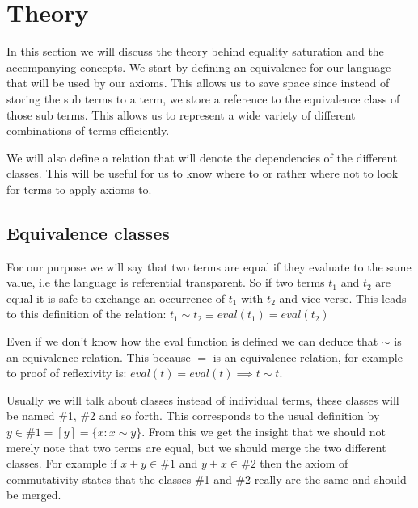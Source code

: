 



\section{Theory}

In this section we will discuss the theory behind equality saturation and the accompanying concepts. We
start by defining an equivalence for our language that will be used by our axioms.
This allows us to save space since instead of storing the sub terms to a term, we
store a reference to the equivalence class of those sub terms. This allows us to represent a wide 
variety of different combinations of terms efficiently.

We will also define a relation
that will denote the dependencies of the different classes. This will be useful for us to know where to
or rather where not to look for terms to apply axioms to.
\subsection{Equivalence classes}


For our purpose we will say that two terms are equal if they evaluate to the same value, i.e the language
is referential transparent. So if two terms $t_1$ and $t_2$ are equal it is safe to exchange an occurrence
of $t_1$ with $t_2$ and vice verse. This leads to this definition of the relation:
$t_1 \sim t_2 \equiv eval(t_1) = eval(t_2)$


Even if we don't know how the eval function is defined we can deduce that $\sim$ is an equivalence relation.
This because $=$ is an equivalence relation, for example to proof of reflexivity is:
$eval(t) = eval(t) \implies t \sim t$.


Usually we will talk about classes instead of individual terms, these classes will
be named \#1, \#2 and so forth. This corresponds to the usual definition by
$y \in \#1 = [y] = \{ x : x \sim y\}$. From this we get the insight that we should
not merely note that two terms are equal, but we should merge the two different classes.
For example if $x + y \in \#1$ and $y + x \in \#2$ then the axiom of commutativity
states that the classes \#1 and \#2 really are the same and should be merged.





